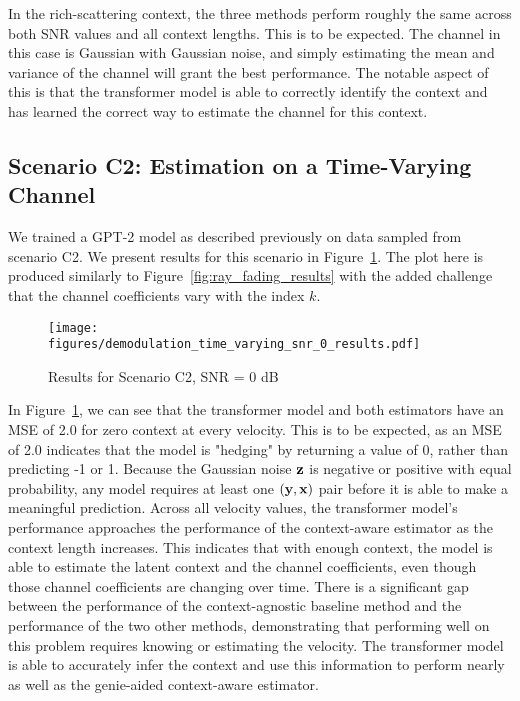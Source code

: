 \documentclass[journal,letterpaper,onecolumn]{IEEEtran}
\begin{document}
In the rich-scattering context, the three methods perform roughly the same across both SNR values and all context lengths. This is to be expected. The channel in this case is Gaussian with Gaussian noise, and simply estimating the mean and variance of the channel will grant the best performance. The notable aspect of this is that the transformer model is able to correctly identify the context and has learned the correct way to estimate the channel for this context.

\subsection{Scenario C2: Estimation on a Time-Varying Channel}
We trained a GPT-2 model as described previously on data sampled from scenario C2. We present results for this scenario in Figure~\ref{fig:time_varying}. The plot here is produced similarly to Figure~\ref{fig:ray_fading_results} with the added challenge that the channel coefficients vary with the index $k$.



\begin{figure}
    \centering
    \texttt{[image: figures/demodulation\_time\_varying\_snr\_0\_results.pdf]}
    \caption{Results for Scenario C2, SNR = 0 dB}
    \label{fig:time_varying}
\end{figure}

In Figure~\ref{fig:time_varying}, we can see that the transformer model and both estimators have an MSE of 2.0 for zero context at every velocity. This is to be expected, as an MSE of 2.0 indicates that the model is "hedging" by returning a value of 0, rather than predicting -1 or 1. Because the Gaussian noise ${\mathbf{z}}$ is negative or positive with equal probability, any model requires at least one $({\mathbf{y}}, {\mathbf{x}})$ pair before it is able to make a meaningful prediction. Across all velocity values, the transformer model's performance approaches the performance of the context-aware estimator as the context length increases. This indicates that with enough context, the model is able to estimate the latent context and the channel coefficients, even though those channel coefficients are changing over time. There is a significant gap between the performance of the context-agnostic baseline method and the performance of the two other methods, demonstrating that performing well on this problem requires knowing or estimating the velocity. The transformer model is able to accurately infer the context and use this information to perform nearly as well as the genie-aided context-aware estimator.
\end{document}
